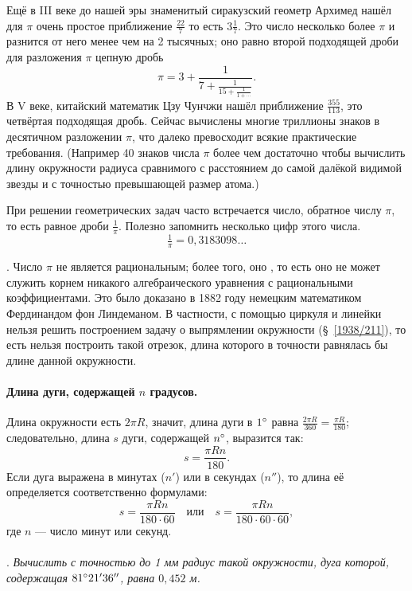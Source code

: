 \documentclass[twoside]{book}
\begin{document}
Ещё в III веке до нашей эры знаменитый сиракузский геометр Архимед нашёл для $\pi$ очень простое приближение $\tfrac{22}7$ то есть $3\tfrac17$.
Это число несколько более $\pi$ и разнится от него менее чем на 2 тысячных;
оно равно второй подходящей дроби для разложения $\pi$ цепную дробь
\[\pi=3+\frac{1}{7+\frac{1}{15+\frac{1}{1+\cdots}}}.\]
В V веке, китайский математик Цзу Чунчжи нашёл приближение $\tfrac{355}{113}$, это четвёртая подходящая дробь. 
Сейчас вычислены многие триллионы знаков в десятичном разложении $\pi$, что далеко превосходит всякие практические требования.
(Например 40 знаков числа $\pi$ более чем достаточно чтобы вычислить длину окружности радиуса сравнимого с расстоянием до самой далёкой видимой звезды и с точностью превышающей размер атома.) 

При решении геометрических задач часто встречается число, обратное числу $\pi$, то есть равное дроби $\tfrac1\pi$.
Полезно запомнить несколько цифр этого числа.
\[\tfrac1\pi = 0{,}3183098\dots\]

\smallskip
{}.
Число $\pi$ не является рациональным;
более того, оно , то есть оно не может служить корнем никакого алгебраического уравнения с рациональными коэффициентами.
Это было доказано в 1882 году немецким математиком Фердинандом фон Линдеманом.
В частности, с помощью циркуля и линейки нельзя решить построением задачу о выпрямлении окружности (§~\ref{1938/211}), то есть нельзя построить такой отрезок, длина которого в точности равнялась бы длине данной окружности.


\paragraph{Длина дуги, содержащей $n$ градусов.}\label{1938/239}
Длина окружности есть $2\pi R$, значит, длина дуги в $1\degree$ равна $\frac{2\pi R}{360}=\frac{\pi R}{180}$; следовательно, длина $s$ дуги, содержащей $n\degree$, выразится так:
\[s=\frac{\pi R n}{180}.\]
Если дуга выражена в минутах ($n'$) или в секундах ($n''$), то длина её определяется соответственно формулами:
\[s=\frac{\pi R n}{180\cdot 60}
\quad\text{или}\quad
s=\frac{\pi R n}{180\cdot 60\cdot 60},\]
где $n$ — число минут или секунд.

\paragraph{}\label{1938/240}
.
\emph{Вычислить с точностью до 1 мм радиус такой окружности, дуга которой, содержащая $81\degree 21'36''$, равна $0{,}452$ м.}
\end{document}
